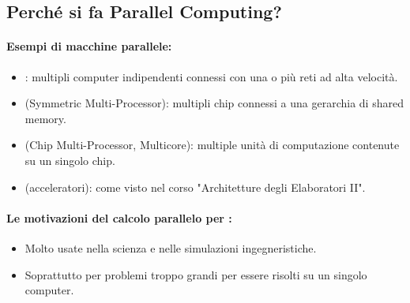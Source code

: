 \subsection{Perché si fa Parallel Computing?}



\paragraph{Esempi di macchine parallele:}

\begin{itemize}
  \item {}: multipli computer indipendenti connessi con una o più reti ad alta velocità.
  \item {} (Symmetric Multi-Processor): multipli chip connessi a una gerarchia di shared memory.
  \item {} (Chip Multi-Processor, Multicore): multiple unità di computazione contenute su un singolo chip.
  \item {} (acceleratori): come visto nel corso "Architetture degli Elaboratori II".
\end{itemize}

\paragraph{Le motivazioni del calcolo parallelo per :}

\begin{itemize}
  \item Molto usate nella scienza e nelle simulazioni ingegneristiche. 
  \item Soprattutto per problemi troppo grandi per essere risolti su un singolo computer.
\end{itemize}

